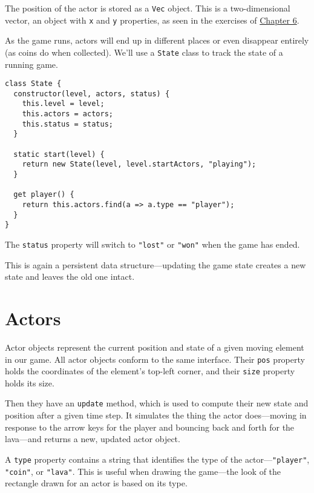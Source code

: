 The position of the actor is stored as a \lstinline`Vec` object. This is a two-dimensional vector, an object with \lstinline`x` and \lstinline`y` properties, as seen in the exercises of \hyperref[object.exercise_vector]{Chapter 6}.

As the game runs, actors will end up in different places or even disappear entirely (as coins do when collected). We'll use a \lstinline`State` class to track the state of a running game.

\begin{lstlisting}
class State {
  constructor(level, actors, status) {
    this.level = level;
    this.actors = actors;
    this.status = status;
  }

  static start(level) {
    return new State(level, level.startActors, "playing");
  }

  get player() {
    return this.actors.find(a => a.type == "player");
  }
}
\end{lstlisting}
\noindent

The \lstinline`status` property will switch to \lstinline`"lost"` or \lstinline`"won"` when the game has ended.

This is again a persistent data structure—updating the game state creates a new state and leaves the old one intact.

\section{Actors}

Actor objects represent the current position and state of a given moving element in our game. All actor objects conform to the same interface. Their \lstinline`pos` property holds the coordinates of the element's top-left corner, and their \lstinline`size` property holds its size.

Then they have an \lstinline`update` method, which is used to compute their new state and position after a given time step. It simulates the thing the actor does—moving in response to the arrow keys for the player and bouncing back and forth for the lava—and returns a new, updated actor object.

A \lstinline`type` property contains a string that identifies the type of the actor—\lstinline`"player"`, \lstinline`"coin"`, or \lstinline`"lava"`. This is useful when drawing the game—the look of the rectangle drawn for an actor is based on its type.

